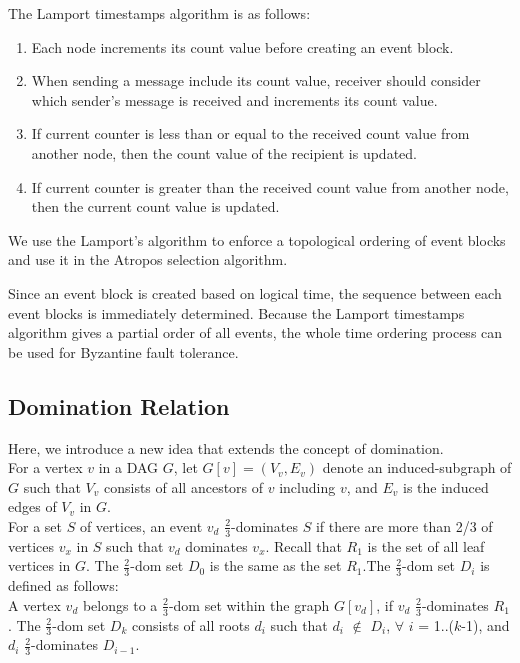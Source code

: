 \documentclass{article}
\begin{document}
The Lamport timestamps algorithm is as follows:

\begin{enumerate}
\item Each node increments its count value before creating an event block.
\item When sending a message include its count value, receiver should consider which sender’s message is received and increments its count value.
\item If current counter is less than or equal to the received count value from another node, then the count value of the recipient is updated.  
\item If current counter is greater than the received count value from another node, then the current count value is updated.
\end{enumerate}


We use the Lamport's algorithm to enforce a topological ordering of event blocks and use it in the Atropos selection algorithm. 

Since an event block is created based on logical time, the sequence between each event blocks is immediately determined. Because the Lamport timestamps algorithm gives a partial order of all events, the whole time ordering process can be used for Byzantine fault tolerance.

\subsection{Domination Relation}

Here, we introduce a new idea that extends the concept of domination.\\

For a vertex $v$ in a DAG $G$, let $G[v] = (V_v,E_v)$ denote an induced-subgraph of $G$ such that $V_v$ consists of all ancestors of $v$ including $v$, and $E_v$ is the induced edges of $V_v$ in $G$.\\

For a set $S$ of vertices, an event $v_d$  $\frac{2}{3}$-dominates $S$ if there are more than 2/3 of vertices $v_x$ in $S$ such that $v_d$ dominates $v_x$. 	
Recall that $R_1$ is the set of all leaf vertices in $G$. The $\frac{2}{3}$-dom set $D_0$ is the same as the set $R_1$.The $\frac{2}{3}$-dom set $D_i$ is defined as follows:	\\

A vertex $v_d$ belongs to a $\frac{2}{3}$-dom set within the graph $G[v_d]$, if $v_d$ $\frac{2}{3}$-dominates $R_1$.
	The $\frac{2}{3}$-dom set $D_k$ consists of all roots $d_i$ such that  $d_i$ $\not \in $ $D_i$, $\forall$ $i$ = 1..($k$-1), and $d_i$ $\frac{2}{3}$-dominates $D_{i-1}$.\\
	
\end{document}

